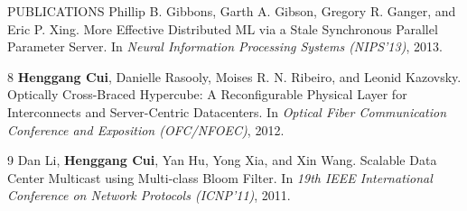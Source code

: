 \documentclass{resume} %
\begin{document}
\begin{rSection}{PUBLICATIONS}
        Phillip B. Gibbons, Garth A. Gibson, Gregory R. Ganger, and Eric P. Xing.
        More Effective Distributed ML via a Stale Synchronous Parallel Parameter Server.
        In \emph{Neural Information Processing Systems (NIPS'13)},
        2013.
    \item
    [8]
        {\bf Henggang Cui}, Danielle Rasooly, Moises R. N. Ribeiro, and Leonid Kazovsky.
        Optically Cross-Braced Hypercube: A Reconfigurable Physical Layer for
        Interconnects and Server-Centric Datacenters.
        In \emph{Optical Fiber Communication Conference and Exposition (OFC/NFOEC)},
        2012.
    \item
    [9]
        Dan Li, {\bf Henggang Cui}, Yan Hu, Yong Xia, and Xin Wang.
        Scalable Data Center Multicast using Multi-class Bloom Filter.
        In \emph{19th IEEE International Conference on Network Protocols (ICNP'11)},
        2011.
\end{rSection}
\end{document}
